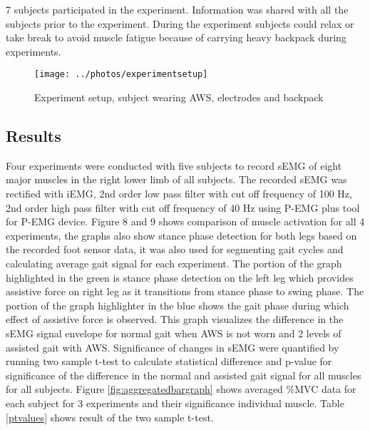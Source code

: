 \documentclass[letterpaper, 10 pt, conference]{ieeeconf}  %
\begin{document}
7 subjects participated in the experiment. Information was shared with all the subjects prior to the experiment. During the experiment subjects could relax or take break to avoid muscle fatigue because of carrying heavy backpack during experiments.


\begin{figure}
	\centering
	\texttt{[image: ../photos/experimentsetup]}
	\caption{Experiment setup, subject wearing AWS, electrodes and backpack }
	\label{fig:experimentsetup}
\end{figure}

\subsection{Results}

Four experiments were conducted with five subjects to record sEMG of eight major muscles in the right lower limb of all subjects. The recorded sEMG was rectified with iEMG, 2nd order low pass filter with cut off frequency of 100 Hz, 2nd order high pass filter with cut off frequency of 40 Hz using P-EMG plus tool for P-EMG device. Figure 8 and 9 shows comparison of muscle activation for all 4 experiments, the graphs also show stance phase detection for both legs based on the recorded foot sensor data, it was also used for segmenting gait cycles and calculating average gait signal for each experiment.  The portion of the graph highlighted in the green is stance phase detection on the left leg which provides assistive force on right leg as it transitions  from stance phase to swing phase. The portion of the graph highlighter in the blue shows the gait phase during which effect of assistive force is observed. This graph visualizes the difference in the sEMG signal envelope for normal gait when AWS is not worn and 2 levels of assisted gait with AWS. Significance of  changes in sEMG were quantified by running two sample t-test to calculate statistical difference and p-value for significance of the difference in the normal and assisted gait signal for all muscles for all subjects. Figure \ref{fig:aggregatedbargraph} shows averaged \%MVC data for each subject for 3 experiments and their significance individual muscle. Table \ref{ptvalues} shows result of the two sample t-test.
\end{document}
